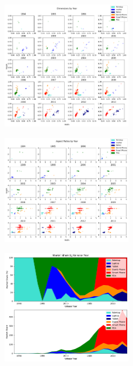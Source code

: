 \documentclass[conference]{IEEEtran}
\begin{document}
\begin{figure}
    \centering
    \includegraphics[width=0.5\textwidth]{Visualisations/B/DimensionsYear.png}
    \caption{}
    \label{fig:DimensionsYear}
\end{figure}
\begin{figure}
    \centering
    \includegraphics[width=0.5\textwidth]{Visualisations/B/AspectRatioYear.png}
    \caption{}
    \label{fig:AspectRatioYear}
\end{figure}
\begin{figure}
    \centering
    \includegraphics[width=0.5\textwidth]{Visualisations/B/MarketShareYear.png}
    \caption{}
    \label{fig:MarketShareYear}
\end{figure}
\end{document}
